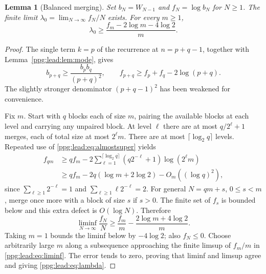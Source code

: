 \documentclass[11pt,letterpaper]{article}
\newtheorem{lemma}[theorem]{Lemma}
\theoremstyle{remark}\newtheorem{remark}[theorem]{Remark}
\numberwithin{equation}{section}
\begin{document}
\begin{lemma}[Balanced merging]\label{ppg:lead:lem:merge}
Set $b_N=W_{N-1}$ and $f_N=\log b_N$ for $N\ge1$. The finite limit
$\lambda_0=\lim_{N\to\infty}f_N/N$ exists. For every $m\ge1$,
\begin{equation}\label{ppg:lead:eq:lambda}
 \lambda_0\ge\frac{f_m-2\log m-4\log2}{m}.
\end{equation}
\end{lemma}
\begin{proof}
The single term $k=p$ of the recurrence at $n=p+q-1$, together with Lemma~\ref{ppg:lead:lem:mode}, gives
\begin{equation}\label{ppg:lead:eq:almostsuper}
 b_{p+q}\ge\frac{b_pb_q}{(p+q)^2},\qquad
 f_{p+q}\ge f_p+f_q-2\log(p+q).
\end{equation}
The slightly stronger denominator $(p+q-1)^2$ has been weakened for convenience.

Fix $m$. Start with $q$ blocks each of size $m$, pairing the available blocks at each level and carrying any unpaired block. At level $\ell$ there are at most $q/2^\ell+1$ merges, each of total size at most $2^\ell m$. There are at most $\lceil\log_2q\rceil$ levels. Repeated use of \eqref{ppg:lead:eq:almostsuper} yields
\begin{align*}
 f_{qm}&\ge qf_m-2\sum_{\ell=1}^{\lceil\log_2q\rceil}
       (q2^{-\ell}+1)\log(2^\ell m)\\
 &\ge qf_m-2q(\log m+2\log2)-O_m((\log q)^2),
\end{align*}
since $\sum_{\ell\ge1}2^{-\ell}=1$ and $\sum_{\ell\ge1}\ell2^{-\ell}=2$.
For general $N=qm+s$, $0\le s<m$, merge once more with a block of size $s$ if $s>0$. The finite set of $f_s$ is bounded below and this extra defect is $O(\log N)$. Therefore
\begin{equation}\label{ppg:lead:eq:liminf}
 \liminf_{N\to\infty}\frac{f_N}{N}
 \ge\frac{f_m}{m}-\frac{2\log m+4\log2}{m}.
\end{equation}
Taking $m=1$ bounds the liminf below by $-4\log2$; also $f_N\le0$. Choose arbitrarily large $m$ along a subsequence approaching the finite limsup of $f_m/m$ in \eqref{ppg:lead:eq:liminf}. The error tends to zero, proving that liminf and limsup agree and giving \eqref{ppg:lead:eq:lambda}.
\end{proof}
\end{document}
